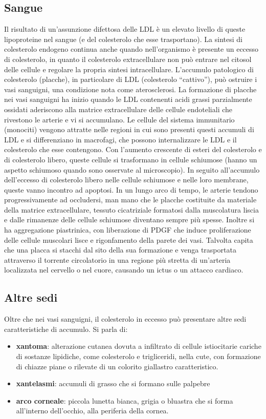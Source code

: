\documentclass[a4paper, 12pt]{article}
\begin{document}
\begin{titlepage}
\subsection{Sangue}
Il risultato di un’assunzione difettosa delle LDL è un elevato livello di queste lipoproteine nel sangue (e del colesterolo che esse trasportano). La sintesi di colesterolo endogeno continua anche quando nell’organismo è presente un eccesso di colesterolo, in quanto il colesterolo extracellulare non può entrare nel citosol delle cellule e regolare la propria sintesi intracellulare.
L’accumulo patologico di colesterolo (placche), in particolare di LDL (colesterolo “cattivo”), può ostruire i vasi sanguigni, una condizione nota come aterosclerosi.  La formazione di placche nei vasi sanguigni ha inizio quando le LDL contenenti acidi grassi parzialmente ossidati aderiscono alla matrice extracellulare delle cellule endoteliali che rivestono le arterie e vi si accumulano. Le cellule del sistema immunitario (monociti) vengono attratte nelle regioni in cui sono presenti questi accumuli di LDL e si differenziano in macrofagi, che possono internalizzare le LDL e il colesterolo che esse contengono. Con l’aumento crescente di esteri del colesterolo e di colesterolo libero, queste cellule si trasformano in cellule schiumose (hanno un aspetto schiumoso quando sono osservate al microscopio). In seguito all’accumulo dell’eccesso di colesterolo libero nelle cellule schiumose e nelle loro membrane, queste vanno incontro ad apoptosi. In un lungo arco di tempo, le arterie tendono progressivamente ad occludersi, man mano che le placche costituite da materiale della matrice extracellulare, tessuto cicatriziale formatosi dalla muscolatura liscia e dalle rimanenze delle cellule schiumose diventano sempre più spesse. Inoltre si ha aggregazione piastrinica, con liberazione di PDGF che induce proliferazione
delle cellule muscolari lisce e rigonfamento della parete dei vasi.
Talvolta capita che una placca si stacchi dal sito della sua formazione e venga trasportata attraverso il torrente circolatorio in una regione più stretta di un’arteria localizzata nel cervello o nel cuore, causando un ictus o un attacco cardiaco.

\subsection{Altre sedi}
Oltre che nei vasi sanguigni, il colesterolo in eccesso può presentare altre sedi caratteristiche di accumulo. Si parla di:
\begin{itemize}
\item \textbf{xantoma}: alterazione cutanea dovuta a infiltrato di cellule istiocitarie cariche di sostanze lipidiche, come colesterolo e trigliceridi, nella cute, con formazione di chiazze piane o rilevate di un colorito giallastro caratteristico.
\item \textbf{xantelasmi}: accumuli di grasso che si formano sulle palpebre
\item \textbf{arco corneale}: piccola lunetta bianca, grigia o bluastra che si forma all’interno dell’occhio, alla periferia della cornea.
\end{itemize}


\end{titlepage}
\end{document}
